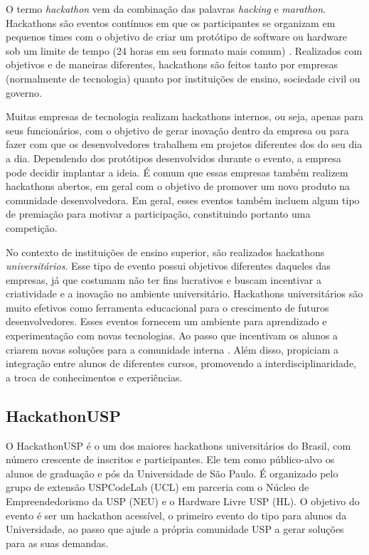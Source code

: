 \documentclass[10pt,twoside,a4paper]{article}
\begin{document}
    O termo \textit{hackathon} vem da combinação das palavras \textit{hacking} e \textit{marathon}. Hackathons são eventos contínuos em que os participantes se organizam em pequenos times com o objetivo de criar um protótipo de software ou hardware sob um limite de tempo (24 horas em seu formato mais comum) \cite{Komssi2015WhatFor}. Realizados com objetivos e de maneiras diferentes, hackathons são feitos tanto por empresas (normalmente de tecnologia) quanto por instituições de ensino, sociedade civil ou governo.
    
    Muitas empresas de tecnologia realizam hackathons internos, ou seja, apenas para seus funcionários, com o objetivo de gerar inovação dentro da empresa ou para fazer com que os desenvolvedores trabalhem em projetos diferentes dos do seu dia a dia. Dependendo dos protótipos desenvolvidos durante o evento, a empresa pode decidir implantar a ideia. É comum que essas empresas também realizem hackathons abertos, em geral com o objetivo de promover um novo produto na comunidade desenvolvedora. Em geral, esses eventos também incluem algum tipo de premiação para motivar a participação, constituindo portanto uma competição.
    
    No contexto de instituições de ensino superior, são realizados hackathons \textit{universitários}. Esse tipo de evento possui objetivos diferentes daqueles das empresas, já que costumam não ter fins lucrativos e buscam incentivar a criatividade e a inovação no ambiente universitário. Hackathons universitários são muito efetivos como ferramenta educacional para o crescimento de futuros desenvolvedores. Esses eventos fornecem um ambiente para aprendizado e experimentação com novas tecnologias. Ao passo que incentivam os alunos a criarem novas soluções para a comunidade interna \cite{Kayastha2017EnablingCompetition}. Além disso, propiciam a integração entre alunos de diferentes cursos, promovendo a interdisciplinaridade, a troca de conhecimentos e experiências.

  \subsection{HackathonUSP}
    
    O HackathonUSP é o um dos maiores hackathons universitários do Brasil, com número crescente de inscritos e participantes. Ele tem como  público-alvo os alunos de graduação e pós da Universidade de São Paulo. É organizado pelo grupo de extensão USPCodeLab (UCL) em parceria com o Núcleo de Empreendedorismo da USP (NEU) e o Hardware Livre USP (HL). O objetivo do evento é ser um hackathon acessível, o primeiro evento do tipo para alunos da Universidade, ao passo que ajude a própria comunidade USP a gerar soluções para as suas demandas.
    
\end{document}
